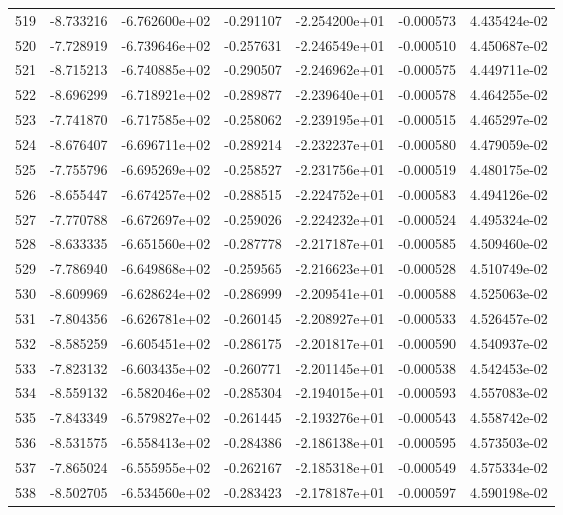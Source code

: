 \begin{tabular}{rrrrrrr}
 519 &  -8.733216 & -6.762600e+02 & -0.291107 & -2.254200e+01 &   -0.000573 &  4.435424e-02 \\
 520 &  -7.728919 & -6.739646e+02 & -0.257631 & -2.246549e+01 &   -0.000510 &  4.450687e-02 \\
 521 &  -8.715213 & -6.740885e+02 & -0.290507 & -2.246962e+01 &   -0.000575 &  4.449711e-02 \\
 522 &  -8.696299 & -6.718921e+02 & -0.289877 & -2.239640e+01 &   -0.000578 &  4.464255e-02 \\
 523 &  -7.741870 & -6.717585e+02 & -0.258062 & -2.239195e+01 &   -0.000515 &  4.465297e-02 \\
 524 &  -8.676407 & -6.696711e+02 & -0.289214 & -2.232237e+01 &   -0.000580 &  4.479059e-02 \\
 525 &  -7.755796 & -6.695269e+02 & -0.258527 & -2.231756e+01 &   -0.000519 &  4.480175e-02 \\
 526 &  -8.655447 & -6.674257e+02 & -0.288515 & -2.224752e+01 &   -0.000583 &  4.494126e-02 \\
 527 &  -7.770788 & -6.672697e+02 & -0.259026 & -2.224232e+01 &   -0.000524 &  4.495324e-02 \\
 528 &  -8.633335 & -6.651560e+02 & -0.287778 & -2.217187e+01 &   -0.000585 &  4.509460e-02 \\
 529 &  -7.786940 & -6.649868e+02 & -0.259565 & -2.216623e+01 &   -0.000528 &  4.510749e-02 \\
 530 &  -8.609969 & -6.628624e+02 & -0.286999 & -2.209541e+01 &   -0.000588 &  4.525063e-02 \\
 531 &  -7.804356 & -6.626781e+02 & -0.260145 & -2.208927e+01 &   -0.000533 &  4.526457e-02 \\
 532 &  -8.585259 & -6.605451e+02 & -0.286175 & -2.201817e+01 &   -0.000590 &  4.540937e-02 \\
 533 &  -7.823132 & -6.603435e+02 & -0.260771 & -2.201145e+01 &   -0.000538 &  4.542453e-02 \\
 534 &  -8.559132 & -6.582046e+02 & -0.285304 & -2.194015e+01 &   -0.000593 &  4.557083e-02 \\
 535 &  -7.843349 & -6.579827e+02 & -0.261445 & -2.193276e+01 &   -0.000543 &  4.558742e-02 \\
 536 &  -8.531575 & -6.558413e+02 & -0.284386 & -2.186138e+01 &   -0.000595 &  4.573503e-02 \\
 537 &  -7.865024 & -6.555955e+02 & -0.262167 & -2.185318e+01 &   -0.000549 &  4.575334e-02 \\
 538 &  -8.502705 & -6.534560e+02 & -0.283423 & -2.178187e+01 &   -0.000597 &  4.590198e-02 \\

\end{tabular}
